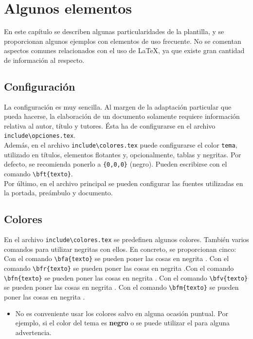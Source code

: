 \chapter{Algunos elementos}

En este capítulo se describen algunas particularidades de la plantilla, y se proporcionan algunos ejemplos con elementos de uso frecuente. No se comentan aspectos comunes relacionados con el uso de \LaTeX, ya que existe gran cantidad de información al respecto.

\section{Configuración}
La configuración es muy sencilla. Al margen de la adaptación particular que pueda hacerse, la elaboración de un documento solamente requiere información relativa al autor, título y tutores. Ésta ha de configurarse en el archivo \verb+include\opciones.tex+.  \\

Además, en el archivo \verb+include\colores.tex+ puede configurarse el color \verb+tema+, utilizado en títulos, elementos flotantes y, opcionalmente, tablas y negritas. Por defecto, se recomienda ponerlo a \verb+{0,0,0}+  (negro). Pueden escribirse  con el comando \verb+\bft{texto}+. \\

Por último, en el archivo principal se pueden configurar las fuentes utilizadas en la portada, preámbulo y documento.

\section{Colores}


En el archivo \verb+include\colores.tex+ se predefinen algunos colores. También varios comandos para utilizar negritas con ellos. En concreto, se proporcionan cinco: Con el comando \verb+\bfa{texto}+ se pueden poner las cosas en negrita . Con el comando \verb+\bfr{texto}+ se pueden poner las cosas en negrita .Con el comando \verb+\bfn{texto}+ se pueden poner las cosas en negrita . Con el comando \verb+\bfv{texto}+ se pueden poner las cosas en negrita . Con el comando \verb+\bfm{texto}+ se pueden poner las cosas en negrita . \\

\begin{itemize}
\item [\hmarkr] No es conveniente usar los colores salvo en alguna ocasión puntual. Por ejemplo, si el color del tema es {\bf negro} o  se puede utilizar el  para alguna advertencia.
\end{itemize}

